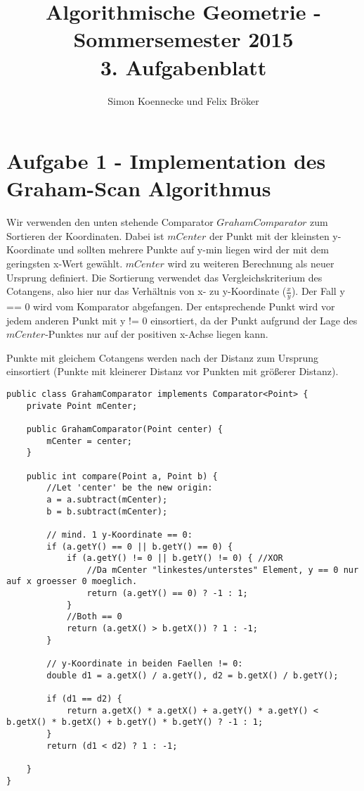 \documentclass[a4paper]{article}
\begin{document}
\title{Algorithmische Geometrie - Sommersemester 2015\\
       3. Aufgabenblatt }
\author{Simon Koennecke und Felix Bröker}
\date{}
\maketitle

\section*{Aufgabe 1 - Implementation des Graham-Scan Algorithmus}

Wir verwenden den unten stehende Comparator $GrahamComparator$ zum Sortieren der Koordinaten. Dabei ist $mCenter$ der Punkt mit der kleinsten y-Koordinate und sollten mehrere Punkte auf y-min liegen wird der mit dem geringsten x-Wert gewählt. $mCenter$ wird zu weiteren Berechnung als neuer Ursprung definiert. Die Sortierung verwendet das Vergleichskriterium  des Cotangens, also hier nur das Verhältnis von x- zu y-Koordinate ($\frac{x}{y}$). 
Der Fall y == 0 wird vom Komparator abgefangen. Der entsprechende Punkt wird vor jedem anderen Punkt
mit y != 0 einsortiert, da der Punkt aufgrund der Lage des $mCenter$-Punktes nur auf der positiven x-Achse liegen kann.

Punkte mit gleichem Cotangens werden nach der Distanz zum Ursprung einsortiert (Punkte mit kleinerer Distanz vor Punkten mit größerer Distanz). 

\begin{lstlisting}
public class GrahamComparator implements Comparator<Point> {
    private Point mCenter;

    public GrahamComparator(Point center) {
        mCenter = center;
    }
   
    public int compare(Point a, Point b) {
    	//Let 'center' be the new origin:
    	a = a.subtract(mCenter);
    	b = b.subtract(mCenter);
    	
    	// mind. 1 y-Koordinate == 0:
    	if (a.getY() == 0 || b.getY() == 0) {
    		if (a.getY() != 0 || b.getY() != 0) { //XOR
    		    //Da mCenter "linkestes/unterstes" Element, y == 0 nur auf x groesser 0 moeglich.
    			return (a.getY() == 0) ? -1 : 1;
    		} 
    		//Both == 0
    		return (a.getX() > b.getX()) ? 1 : -1;
    	}

    	// y-Koordinate in beiden Faellen != 0:
    	double d1 = a.getX() / a.getY(), d2 = b.getX() / b.getY();
    	
    	if (d1 == d2) {
    		return a.getX() * a.getX() + a.getY() * a.getY() < b.getX() * b.getX() + b.getY() * b.getY() ? -1 : 1;
    	}
        return (d1 < d2) ? 1 : -1;

    }
}
\end{lstlisting}
\end{document}
